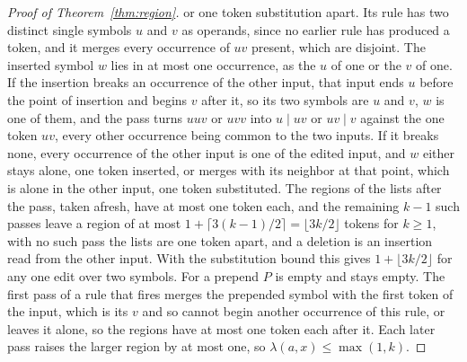 \documentclass[11pt,a4paper]{article}
\theoremstyle{definition}
\theoremstyle{plain}
\begin{document}
\begin{proof}[Proof of Theorem~\ref{thm:region}]
or one token substitution apart. Its rule has two distinct single symbols \(u\) and \(v\) as operands, since no earlier
rule has produced a token, and it merges every occurrence of \(uv\) present, which are disjoint. The inserted symbol
\(w\) lies in at most one occurrence, as the \(u\) of one or the \(v\) of one. If the insertion breaks an occurrence of
the other input, that input ends \(u\) before the point of insertion and begins \(v\) after it, so its two symbols are
\(u\) and \(v\), \(w\) is one of them, and the pass turns \(uuv\) or \(uvv\) into \(u \mid uv\) or \(uv \mid v\) against
the one token \(uv\), every other occurrence being common to the two inputs. If it breaks none, every occurrence of the
other input is one of the edited input, and \(w\) either stays alone, one token inserted, or merges with its neighbor at
that point, which is alone in the other input, one token substituted. The regions of the lists after the pass, taken
afresh, have at most one token each, and the remaining \(k - 1\) such passes leave a region of at most
\(1 + \lceil 3(k - 1)/2 \rceil = \lfloor 3k/2 \rfloor\) tokens for \(k \ge 1\), with no such pass the lists are one
token apart, and a deletion is an insertion read from the other input. With the substitution bound this gives
\(1 + \lfloor 3k/2 \rfloor\) for any one edit over two symbols. For a prepend \(P\) is empty and stays empty. The first
pass of a rule that fires merges the prepended symbol with the first token of the input, which is its \(v\) and so
cannot begin another occurrence of this rule, or leaves it alone, so the regions have at most one token each after it.
Each later pass raises the larger region by at most one, so \(\lambda(a, x) \le \max(1, k)\).


\end{proof}
\end{document}
